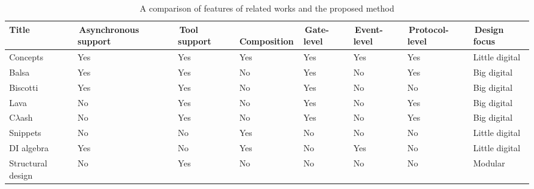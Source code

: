 \documentclass[british, journal]{IEEEtran}
\begin{document}
\begin{table}[t]
\caption{A comparison of features of related works and the proposed method \label{tab:related_work}}
  \centering
  \begin{tabular}[htb]{| m{2.6cm} | m{2.0cm} | m{1.3cm} | m{1.75cm} | m{1.5cm} | m{1.5cm} | m{1.7cm} | m{1.9cm} |}
  \hline
  Title             & \,Asynchronous support & \,Tool support  & \,Composition & \,Gate-level & \,Event-level & \,Protocol-level  & \,Design focus \\ \hline \hline
  Concepts            & Yes                               & Yes                  & Yes               & Yes                       & Yes                         & Yes                              & Little digital \\ \hline
  Balsa             & Yes                               & Yes                  & No                & Yes                       & No                          & Yes                              & Big digital \\ \hline
  Biscotti            & Yes                               & Yes                  & No                & Yes                       & No                          & No                               & Big digital \\ \hline
  Lava              & No                               & Yes                  & No                & Yes                       & No                          & Yes                              & Big digital \\ \hline
  C$\lambda$ash     & No                               & Yes                  & No                & Yes                       & No                          & Yes                              & Big digital \\ \hline
  Snippets          & No                                & No                   & Yes               & No                        & No                          & No                               & Little digital \\ \hline
  DI algebra        & Yes                               & No                   & Yes               & No                        & Yes                         & No                               & Little digital \\ \hline
  Structural design & No                                & Yes                  & No                & No                        & No                          & No                               & Modular \\ \hline
  \end{tabular}
  \vspace{-3mm}
\end{table}
\end{document}
